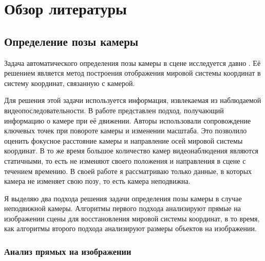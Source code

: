 \chapter{Обзор литературы}  \label{chapt1}

\section{Определение позы камеры}

Задача автоматического определения позы камеры в сцене исследуется давно \cite{caprile1990using,li2010simultaneous,liu2011surveillance,chen2007accurate,pflugfelder2007people,den2015automatic,puwein2012ptz,dubska2014automatic}. Её решением является метод построения отображения мировой системы координат в систему координат, связанную с камерой.

Для решения этой задачи используется информация, извлекаемая из наблюдаемой видеопоследовательности. В работе \cite{puwein2012ptz} представлен подход, получающий информацию о камере при её движении. Авторы использовали сопровождение ключевых точек при повороте камеры и изменении масштаба. Это позволило оценить фокусное расстояние камеры и направление осей мировой системы координат. В то же время большое количество камер видеонаблюдения являются статичными, то есть не изменяют своего положения и направления в сцене с течением времению. В своей работе я рассматриваю только данные, в которых камера не изменяет свою позу, то есть камера неподвижна.

Я выделяю два подхода решения задачи определения позы камеры в случае неподвижной камеры. Алгоритмы первого подхода анализируют прямые на изображении сцены для восстановления мировой системы координат, в то время, как алгоритмы второго подхода анализируют размеры объектов на изображении.

\subsection{Анализ прямых на изображении}

